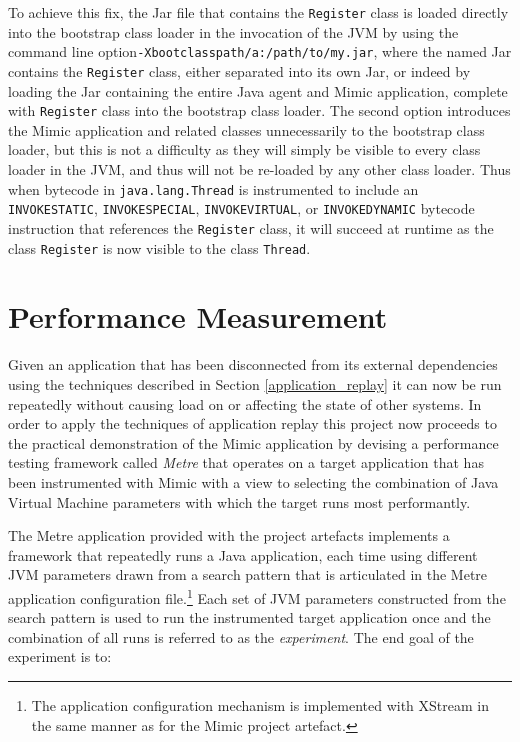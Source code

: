 \documentclass[]{final_report}
\begin{document}
To achieve this fix, the Jar file that contains the \lstinline{Register} class is loaded directly into the bootstrap class loader in the invocation of the JVM by using the command line option\linebreak[4] \lstinline{-Xbootclasspath/a:/path/to/my.jar}, where the named Jar contains the \lstinline{Register} class, either separated into its own Jar, or indeed by loading the Jar containing the entire Java agent and Mimic application, complete with \lstinline{Register} class into the bootstrap class loader. The second option introduces the Mimic application and related classes unnecessarily to the bootstrap class loader, but this is not a difficulty as they will simply be visible to every class loader in the JVM, and thus will not be re-loaded by any other class loader. Thus when bytecode in \lstinline{java.lang.Thread} is instrumented to include an \lstinline{INVOKESTATIC}, \lstinline{INVOKESPECIAL}, \lstinline{INVOKEVIRTUAL}, or \lstinline{INVOKEDYNAMIC} bytecode instruction that references the \lstinline{Register} class, it will succeed at runtime as the class \lstinline{Register} is now visible to the class \lstinline{Thread}.

\section{Performance Measurement}

Given an application that has been disconnected from its external dependencies using the techniques described in Section \ref{application_replay} it can now be run repeatedly without causing load on or affecting the state of other systems. In order to apply the techniques of application replay this project now proceeds to the practical demonstration of the Mimic application by devising a performance testing framework called \textit{Metre} that operates on a target application that has been instrumented with Mimic with a view to selecting the combination of Java Virtual Machine parameters with which the target runs most performantly.

The Metre application provided with the project artefacts implements a framework that repeatedly runs a Java application, each time using different JVM parameters drawn from a search pattern that is articulated in the Metre application configuration file.\footnote{The application configuration mechanism is implemented with XStream in the same manner as for the Mimic project artefact.} Each set of JVM parameters constructed from the search pattern is used to run the instrumented target application once and the combination of all runs is referred to as the \textit{experiment}. The end goal of the experiment is to:
\end{document}
